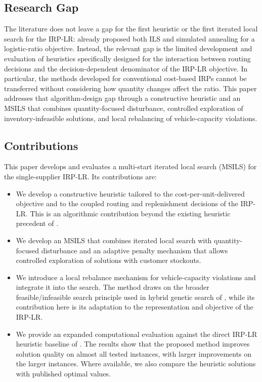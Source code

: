 \documentclass{article}
\begin{document}
\subsection{Research Gap}
\label{sec:research_gap}

The literature does not leave a gap for the first heuristic or the first
iterated local search for the IRP-LR: \cite{alvarez2018iterated} already
proposed both ILS and simulated annealing for a logistic-ratio objective.
Instead, the relevant gap is the limited development and evaluation of
heuristics specifically designed for the interaction between routing
decisions and the decision-dependent denominator of the IRP-LR objective.
In particular, the methods developed for conventional cost-based IRPs
cannot be transferred without considering how quantity changes affect the
ratio. This paper addresses that algorithm-design gap through a
constructive heuristic and an MSILS that combines quantity-focused
disturbance, controlled exploration of inventory-infeasible solutions,
and local rebalancing of vehicle-capacity violations.

\subsection{Contributions}
\label{sec:contributions}

This paper develops and evaluates a multi-start iterated local search
(MSILS) for the single-supplier IRP-LR. Its contributions are:
\begin{itemize}
    \item We develop a constructive heuristic tailored to the
    cost-per-unit-delivered objective and to the coupled routing and
    replenishment decisions of the IRP-LR. This is an algorithmic
    contribution beyond the existing heuristic precedent of
    \cite{alvarez2018iterated}.

    \item We develop an MSILS that combines iterated local search with
    quantity-focused disturbance and an adaptive penalty mechanism that
    allows controlled exploration of solutions with customer stockouts.

    \item We introduce a local rebalance mechanism for vehicle-capacity
    violations and integrate it into the search. The method draws on the
    broader feasible/infeasible search principle used in hybrid genetic
    search of \cite{vidal2022hybrid}, while its contribution here is its adaptation to the
    representation and objective of the IRP-LR.

    \item We provide an expanded computational evaluation against the
    direct IRP-LR heuristic baseline of \cite{alvarez2018iterated}.
    The results show that the proposed method improves solution quality on
    almost all tested instances, with larger improvements on the larger
    instances. Where available, we also compare the heuristic solutions
    with published optimal values.
\end{itemize}
\end{document}
